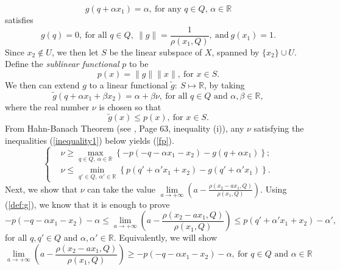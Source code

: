 \documentclass[12pt, reqno]{amsart}
\theoremstyle{definition}
\theoremstyle{remark}
\numberwithin{equation}{section}
\begin{document}
\begin{equation}
\label{def:g}
g(q+\alpha x_1)=\alpha,~\mbox{for any $q\in Q$, $\alpha\in\mathbb R$}
\end{equation}
satisfies
\begin{equation}
\label{linearg}
g(q)=0,~\mbox{for all $q\in Q$},~\|g\|=\frac{1}{\rho(x_1,Q)},~\mbox{and}~g(x_1)=1.
\end{equation}
Since $x_2\notin U$, we then let $S$ be the linear subspace of $X$, spanned by $\{x_2\}\cup U$. Define the \emph{sublinear functional} $p$ to be
\begin{equation}
\label{px}
p(x)=\|g\|\|x\|,~\mbox{for $x\in S$}.
\end{equation}
We then can extend $g$ to a linear functional $\tilde g:~S\longmapsto \mathbb R$, by taking
\begin{equation}
\label{def:nu}
\tilde g(q+\alpha x_1+\beta x_2)=\alpha+\beta \nu,~\mbox{for all $q\in Q$ and $\alpha,\beta\in\mathbb R$},
\end{equation}
where the real number $\nu$ is chosen so that
\begin{equation}
\label{fp}
\tilde g(x)\le p(x),~\mbox{for $x\in S$}.
\end{equation}
From Hahn-Banach Theorem (see \cite{Dunford}, Page 63, inequality (i)), any $\nu$ satisfying the inequalities (\ref{inequality1}) below yields (\ref{fp}).
\begin{equation}
\label{inequality1}
\left\{\begin{array}{ll}
&\nu\ge\max\limits_{q\in Q,~\alpha\in \mathbb R}\left\{-p(-q-\alpha x_1-x_2)-g(q+\alpha x_1)\right\};\\
&\nu\le \min\limits_{q'\in Q,~\alpha'\in \mathbb R}\left\{p(q'+\alpha' x_1+x_2)-g(q'+\alpha' x_1)\right\}.
\end{array}\right.
\end{equation}
Next, we show that $\nu$ can take the value $\lim\limits_{a\to+\infty}\left(a-\frac{\rho(x_2-a x_1,Q)}{\rho(x_1,Q)}\right)$. Using (\ref{def:g}), we know that it is enough to prove 
\begin{equation}
\label{inequality2}
-p(-q-\alpha x_1-x_2)-\alpha\le \lim\limits_{a\to+\infty}\left(a-\frac{\rho(x_2-a x_1,Q)}{\rho(x_1,Q)}\right)\le p(q'+\alpha' x_1+x_2)-\alpha',
\end{equation}
for all $q,q'\in Q$ and $\alpha,\alpha'\in\mathbb R$. Equivalently, we will show
\begin{equation}
\label{inequality21}
 \lim\limits_{a\to+\infty}\left(a-\frac{\rho(x_2-a x_1,Q)}{\rho(x_1,Q)}\right)\ge-p(-q-\alpha x_1-x_2)-\alpha,~\mbox{for $q\in Q$ and $\alpha\in\mathbb R$}
\end{equation}
\end{document}
